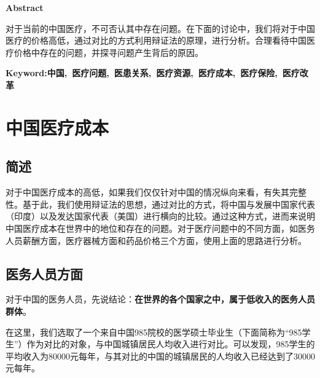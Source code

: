 \documentclass[11pt,twoside,a4paper]{article}
\begin{document}
	\newpage
	\begin{center}
	\textbf{Abstract}	
	\end{center}
		对于当前的中国医疗，不可否认其中存在问题。在下面的讨论中，我们将对于中国医疗的价格高低，通过对比的方式利用辩证法的原理，进行分析。合理看待中国医疗价格中存在的问题，并探寻问题产生背后的原因。
	\begin{flushleft}
	\textbf{Keyword:中国,\ 医疗问题,\ 医患关系,\ 医疗资源,\ 医疗成本,\ 医疗保险,\ 医疗改革}
	\end{flushleft}

	\newpage
	
	\tableofcontents
	
	\newpage
	
	\section{中国医疗成本}
		\subsection{简述}
		对于中国医疗成本的高低，如果我们仅仅针对中国的情况纵向来看，有失其完整性。基于此，我们使用辩证法的思想，通过对比的方式，将中国与发展中国家代表（印度）以及发达国家代表（美国）进行横向的比较。通过这种方式，进而来说明中国医疗成本在世界中的地位和存在的问题。对于医疗问题中的不同方面，如医务人员薪酬方面，医疗器械方面和药品价格三个方面，使用上面的思路进行分析。
		\subsection{医务人员方面}
		对于中国的医务人员，先说结论：\textbf{在世界的各个国家之中，属于低收入的医务人员群体}。
		
		在这里，我们选取了一个来自中国985院校的医学硕士毕业生（下面简称为“985学生”）作为对比的对象，与中国城镇居民人均收入进行对比。可以发现，985学生的平均收入为$80000$元每年，与其对比的中国的城镇居民的人均收入已经达到了$30000$元每年。
		
\end{document}
